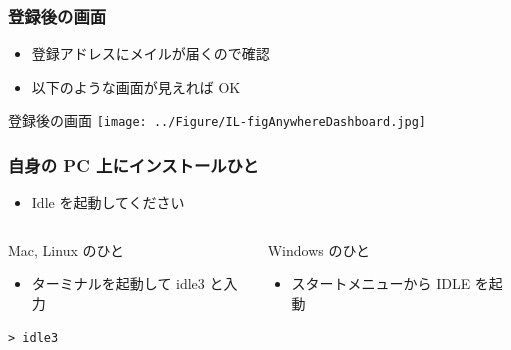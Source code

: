 \begin{frame}
\frametitle{登録後の画面}
  \begin{itemize}
\item 登録アドレスにメイルが届くので確認
\item 以下のような画面が見えれば OK
  \end{itemize}
  \begin{itembox}{登録後の画面}
\texttt{[image: ../Figure/IL-figAnywhereDashboard.jpg]}
  \end{itembox}
\end{frame}
\begin{frame}
\frametitle{自身の PC 上にインストールひと}
  \begin{itemize}
\item Idle を起動してください
  \end{itemize}
  \begin{columns}[t]
    \begin{column}{0.5\textwidth}
      \begin{itembox}{\footnotesize Mac, Linux のひと}
        \begin{itemize}
\scriptsize
\item ターミナルを起動して idle3 と入力
        \end{itemize}
        \begin{verbatim}
> idle3
        \end{verbatim}
      \end{itembox}
    \end{column}
    \begin{column}{0.5\textwidth}
      \begin{itembox}{\footnotesize Windows のひと}
        \begin{itemize}
\item スタートメニューから IDLE を起動
        \end{itemize}
      \end{itembox}
    \end{column}
  \end{columns}
\end{frame}

